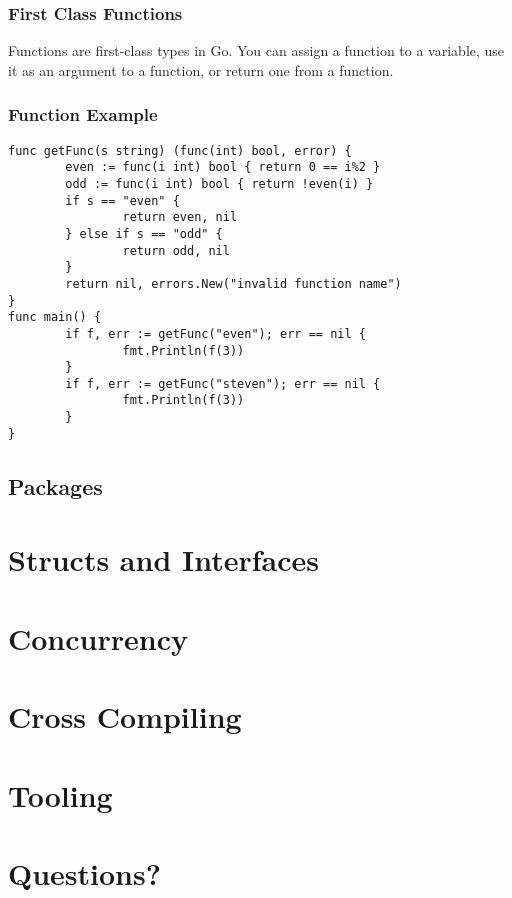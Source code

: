 \documentclass{beamer}
\begin{document}
\begin{frame}
  \frametitle{First Class Functions}
  Functions are first-class types in Go.  You can assign a function to
  a variable, use it as an argument to a function, or return one from
  a function.
\end{frame}

\begin{frame}[fragile]
  \frametitle{Function Example}
\begin{lstlisting}[language=Golang]
func getFunc(s string) (func(int) bool, error) {
        even := func(i int) bool { return 0 == i%2 }
        odd := func(i int) bool { return !even(i) }
        if s == "even" {
                return even, nil
        } else if s == "odd" {
                return odd, nil
        }
        return nil, errors.New("invalid function name")
}
func main() {
        if f, err := getFunc("even"); err == nil {
                fmt.Println(f(3))
        }
        if f, err := getFunc("steven"); err == nil {
                fmt.Println(f(3))
        }
}
\end{lstlisting}
\end{frame}

\subsection{Packages}

\section{Structs and Interfaces}

\section{Concurrency}

\section{Cross Compiling}

\section{Tooling}

\section{Questions?}
\end{document}
